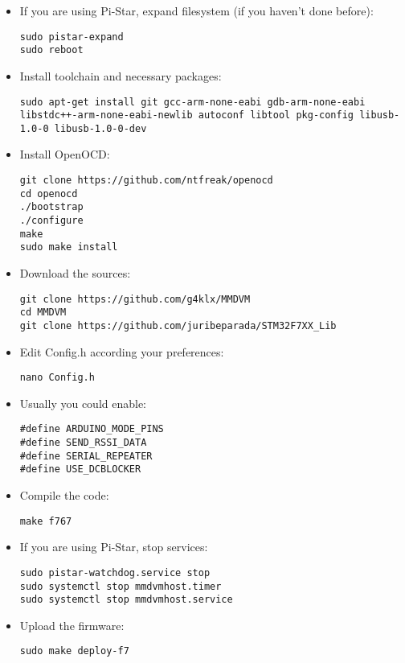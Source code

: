 \documentclass[]{article}
\begin{document}
\begin{itemize}[leftmargin=*]

\item If you are using Pi-Star, expand filesystem (if you haven't done before):
\begin{lstlisting}[style=DOS]
sudo pistar-expand
sudo reboot
\end{lstlisting}

\item Install toolchain and necessary packages:
\begin{lstlisting}[style=DOS]
sudo apt-get install git gcc-arm-none-eabi gdb-arm-none-eabi libstdc++-arm-none-eabi-newlib autoconf libtool pkg-config libusb-1.0-0 libusb-1.0-0-dev
\end{lstlisting}

\item Install OpenOCD:
\begin{lstlisting}[style=DOS]
git clone https://github.com/ntfreak/openocd
cd openocd
./bootstrap
./configure
make
sudo make install
\end{lstlisting}

\item Download the sources:
\begin{lstlisting}[style=DOS]
git clone https://github.com/g4klx/MMDVM
cd MMDVM
git clone https://github.com/juribeparada/STM32F7XX_Lib
\end{lstlisting}

\item Edit Config.h according your preferences:
\begin{lstlisting}[style=DOS]
nano Config.h
\end{lstlisting}

\item Usually you could enable:

\begin{verbatim}
#define ARDUINO_MODE_PINS
#define SEND_RSSI_DATA
#define SERIAL_REPEATER
#define USE_DCBLOCKER
\end{verbatim}

\item Compile the code:
\begin{lstlisting}[style=DOS]
make f767
\end{lstlisting}

\item If you are using Pi-Star, stop services:
\begin{lstlisting}[style=DOS]
sudo pistar-watchdog.service stop
sudo systemctl stop mmdvmhost.timer
sudo systemctl stop mmdvmhost.service
\end{lstlisting}

\item Upload the firmware:
\begin{lstlisting}[style=DOS]
sudo make deploy-f7
\end{lstlisting}

\end{itemize}
\end{document}
